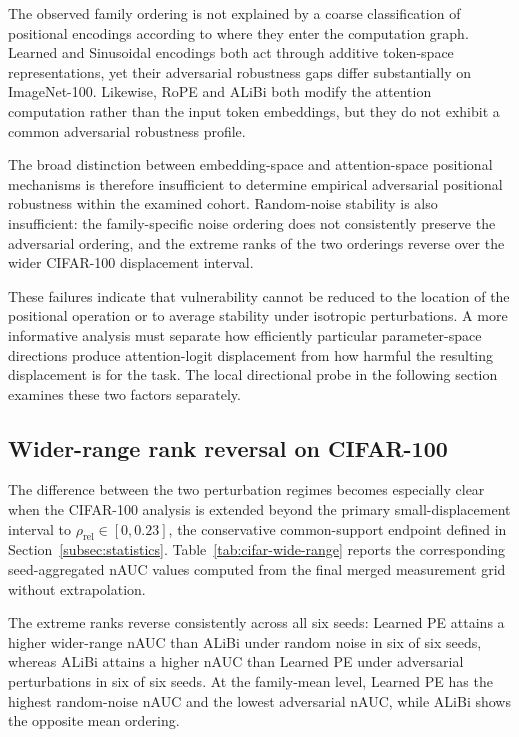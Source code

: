 \documentclass[preprint,12pt,authoryear]{elsarticle}
\begin{document}
The observed family ordering is not explained by a coarse
classification of positional encodings according to where they
enter the computation graph. Learned and Sinusoidal encodings both
act through additive token-space representations, yet their
adversarial robustness gaps differ substantially on ImageNet-100.
Likewise, RoPE and ALiBi both modify the attention computation
rather than the input token embeddings, but they do not exhibit a
common adversarial robustness profile.

The broad distinction between embedding-space and attention-space
positional mechanisms is therefore insufficient to determine
empirical adversarial positional robustness within the examined
cohort. Random-noise stability is also insufficient: the
family-specific noise ordering does not consistently preserve the
adversarial ordering, and the extreme ranks of the two orderings reverse
over the wider CIFAR-100 displacement interval.

These failures indicate that vulnerability cannot be reduced to
the location of the positional operation or to average stability
under isotropic perturbations. A more informative analysis must
separate how efficiently particular parameter-space directions
produce attention-logit displacement from how harmful the resulting
displacement is for the task. The local directional probe in the
following section examines these two factors separately.


\subsection{Wider-range rank reversal on CIFAR-100}

The difference between the two perturbation regimes becomes especially
clear when the CIFAR-100 analysis is extended beyond the primary
small-displacement interval to
$\rho_{\mathrm{rel}}\in[0,0.23]$, the conservative common-support
endpoint defined in Section~\ref{subsec:statistics}.
Table~\ref{tab:cifar-wide-range} reports the corresponding
seed-aggregated nAUC values computed from the final merged measurement
grid without extrapolation.



The extreme ranks reverse consistently across all six seeds: Learned PE
attains a higher wider-range nAUC than ALiBi under random noise in six
of six seeds, whereas ALiBi attains a higher nAUC than Learned PE under
adversarial perturbations in six of six seeds. At the family-mean level,
Learned PE has the highest random-noise nAUC and the lowest adversarial
nAUC, while ALiBi shows the opposite mean ordering.
\end{document}
